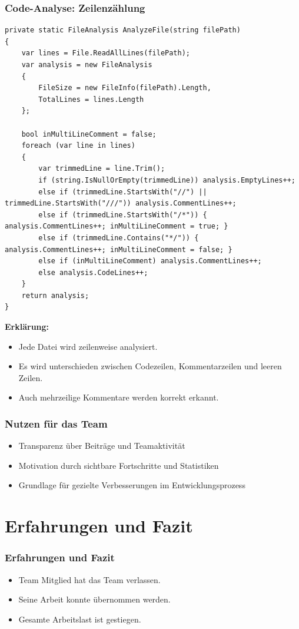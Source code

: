 \documentclass{beamer}
\begin{document}
\begin{frame}[fragile]
\frametitle{Code-Analyse: Zeilenzählung}
\begin{lstlisting}[language=CSharp, basicstyle=\ttfamily\tiny, breaklines=true]
private static FileAnalysis AnalyzeFile(string filePath)
{
    var lines = File.ReadAllLines(filePath);
    var analysis = new FileAnalysis
    {
        FileSize = new FileInfo(filePath).Length,
        TotalLines = lines.Length
    };

    bool inMultiLineComment = false;
    foreach (var line in lines)
    {
        var trimmedLine = line.Trim();
        if (string.IsNullOrEmpty(trimmedLine)) analysis.EmptyLines++;
        else if (trimmedLine.StartsWith("//") || trimmedLine.StartsWith("///")) analysis.CommentLines++;
        else if (trimmedLine.StartsWith("/*")) { analysis.CommentLines++; inMultiLineComment = true; }
        else if (trimmedLine.Contains("*/")) { analysis.CommentLines++; inMultiLineComment = false; }
        else if (inMultiLineComment) analysis.CommentLines++;
        else analysis.CodeLines++;
    }
    return analysis;
}
\end{lstlisting}

\textbf{Erklärung:}
{\footnotesize
\begin{itemize}
  \item Jede Datei wird zeilenweise analysiert.
  \item Es wird unterschieden zwischen Codezeilen, Kommentarzeilen und leeren Zeilen.
  \item Auch mehrzeilige Kommentare werden korrekt erkannt.
\end{itemize}
}
\end{frame}

\begin{frame}
\frametitle{Nutzen für das Team}
\begin{itemize}
  \item Transparenz über Beiträge und Teamaktivität
  \item Motivation durch sichtbare Fortschritte und Statistiken
  \item Grundlage für gezielte Verbesserungen im Entwicklungsprozess
\end{itemize}
\end{frame}

\section{Erfahrungen und Fazit}
\begin{frame}
\frametitle{Erfahrungen und Fazit}
\begin{itemize}
  \item Team Mitglied hat das Team verlassen.
  \item Seine Arbeit konnte übernommen werden.
  \item Gesamte Arbeitslast ist gestiegen. 
\end{itemize}
\end{frame}
\end{document}
